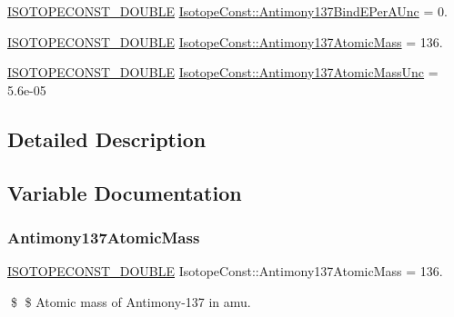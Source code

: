 \begin{DoxyCompactItemize}
\mbox{\hyperlink{group___isotope_const-_macros_ga8f45a7272ce02c0b4c65c44636ed719a}{I\+S\+O\+T\+O\+P\+E\+C\+O\+N\+S\+T\+\_\+\+D\+O\+U\+B\+LE}} \mbox{\hyperlink{group___isotope_const-_antimony-_sb137_ga7f1c1e49b0df74d08aa826697d6718d0}{Isotope\+Const\+::\+Antimony137\+Bind\+E\+Per\+A\+Unc}} = 0.
\item 
\mbox{\hyperlink{group___isotope_const-_macros_ga8f45a7272ce02c0b4c65c44636ed719a}{I\+S\+O\+T\+O\+P\+E\+C\+O\+N\+S\+T\+\_\+\+D\+O\+U\+B\+LE}} \mbox{\hyperlink{group___isotope_const-_antimony-_sb137_ga39f9e34c3550a1dd917b18e6a39ba6fe}{Isotope\+Const\+::\+Antimony137\+Atomic\+Mass}} = 136.
\item 
\mbox{\hyperlink{group___isotope_const-_macros_ga8f45a7272ce02c0b4c65c44636ed719a}{I\+S\+O\+T\+O\+P\+E\+C\+O\+N\+S\+T\+\_\+\+D\+O\+U\+B\+LE}} \mbox{\hyperlink{group___isotope_const-_antimony-_sb137_ga250794ec3f8d6f1a93148b03f27407aa}{Isotope\+Const\+::\+Antimony137\+Atomic\+Mass\+Unc}} = 5.\+6e-\/05
\end{DoxyCompactItemize}


\subsection{Detailed Description}


\subsection{Variable Documentation}
\mbox{\label{group___isotope_const-_antimony-_sb137_ga39f9e34c3550a1dd917b18e6a39ba6fe}} 
\subsubsection{\texorpdfstring{Antimony137\+Atomic\+Mass}{Antimony137AtomicMass}}
{\footnotesize\ttfamily \mbox{\hyperlink{group___isotope_const-_macros_ga8f45a7272ce02c0b4c65c44636ed719a}{I\+S\+O\+T\+O\+P\+E\+C\+O\+N\+S\+T\+\_\+\+D\+O\+U\+B\+LE}} Isotope\+Const\+::\+Antimony137\+Atomic\+Mass = 136.}

\$ \$ Atomic mass of Antimony-\/137 in amu. \mbox{\label{group___isotope_const-_antimony-_sb137_ga250794ec3f8d6f1a93148b03f27407aa}} 
